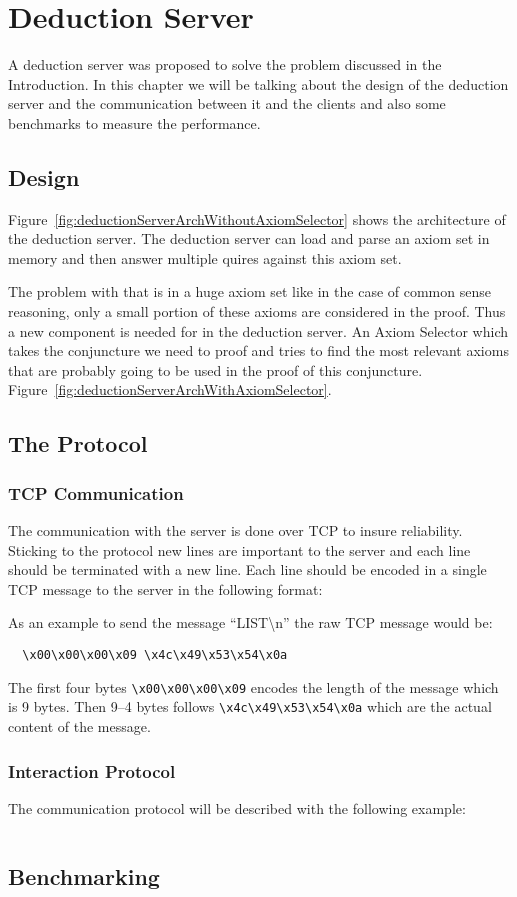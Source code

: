 \chapter{Deduction Server}
A deduction server was proposed to solve the problem discussed in the Introduction. In this chapter we will be talking about the design of the deduction server and the communication between it and the clients and also some benchmarks to measure the performance.
\section{Design}
Figure~\ref{fig:deductionServerArchWithoutAxiomSelector} shows the architecture of the deduction server. The deduction server can load and parse an axiom set in memory and then answer multiple quires against this axiom set.

The problem with that is in a huge axiom set like in the case of common sense reasoning, only a small portion of these axioms are considered in the proof. Thus a new component is needed for in the deduction server. An Axiom Selector which takes the conjuncture we need to proof and tries to find the most relevant axioms that are probably going to be used in the proof of this conjuncture. Figure~\ref{fig:deductionServerArchWithAxiomSelector}.

\section{The Protocol}
\subsection{TCP Communication}\label{subsec:tcpCommunication}
The communication with the server is done over TCP to insure reliability. Sticking to the protocol new lines are important to the server and each line should be terminated with a new line. Each line should be encoded in a single TCP message to the server in the following format:

As an example to send the message ``LIST\textbackslash{}n'' the raw TCP message would be:
\begin{lstlisting}
  \x00\x00\x00\x09 \x4c\x49\x53\x54\x0a
\end{lstlisting}
The first four bytes \lstinline{\x00\x00\x00\x09} encodes the length of the message which is 9 bytes. Then 9--4 bytes follows \lstinline{\x4c\x49\x53\x54\x0a} which are the actual content of the message.
\subsection{Interaction Protocol}\label{subsec:interactionProtocol}
The communication protocol will be described with the following example:
\begin{lstlisting}

\end{lstlisting}

\section{Benchmarking}
